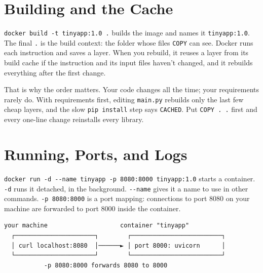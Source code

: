 \section{Building and the Cache}\label{05-docker-in-practice:building-and-the-cache}

\texttt{docker\ build\ -}\allowbreak{}\texttt{t\ tinyapp:}\allowbreak{}\texttt{1.}\allowbreak{}\texttt{0\ .} builds the image and names it \texttt{tinyapp:1.0}. The final \texttt{.} is the build context: the folder whose files \texttt{COPY} can see. Docker runs each instruction and saves a layer. When you rebuild, it reuses a layer from its build cache if the instruction and its input files haven't changed, and it rebuilds everything after the first change.

That is why the order matters. Your code changes all the time; your requirements rarely do. With requirements first, editing \texttt{main.py} rebuilds only the last few cheap layers, and the slow \texttt{pip\ install} step says \texttt{CACHED}. Put \texttt{COPY\ .\ .} first and every one-line change reinstalls every library.

\section{Running, Ports, and Logs}\label{05-docker-in-practice:running-ports-and-logs}

\texttt{docker\ run\ -}\allowbreak{}\texttt{d\ -}\allowbreak{}\texttt{-}\allowbreak{}\texttt{name\ tinyapp\ -}\allowbreak{}\texttt{p\ 8080:}\allowbreak{}\texttt{8000\ tinyapp:}\allowbreak{}\texttt{1.}\allowbreak{}\texttt{0} starts a container. \texttt{-d} runs it detached, in the background. \texttt{-\/-name} gives it a name to use in other commands. \texttt{-p\ 8080:8000} is a port mapping: connections to port 8080 on your machine are forwarded to port 8000 inside the container.

\begin{codeblock}
\begin{Verbatim}[breaklines=false, fontsize=\fontsize{8.8}{8.68}\selectfont, fontfamily=diagrammono, formatcom=\diagramlines]
   your machine                    container "tinyapp"
  ┌──────────────────────┐        ┌─────────────────────────┐
  │ curl localhost:8080  │──────► │ port 8000: uvicorn      │
  └──────────────────────┘        └─────────────────────────┘
           -p 8080:8000 forwards 8080 to 8000
\end{Verbatim}
\end{codeblock}

